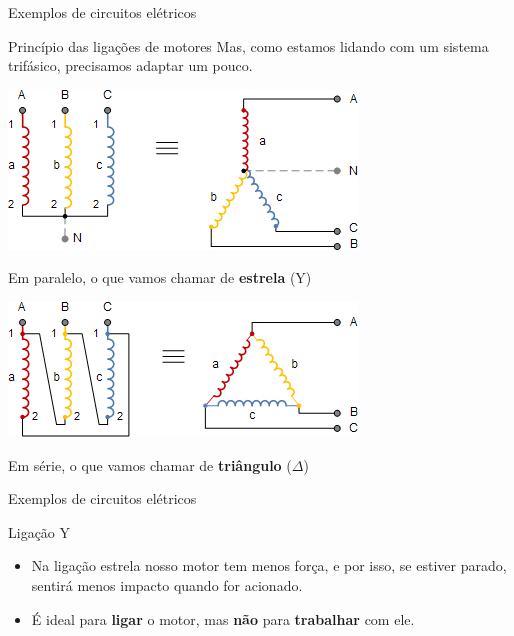 \begin{frame}{Exemplos de circuitos elétricos}
\begin{block}{Princípio das ligações de motores}
	Mas, como estamos lidando com um sistema trifásico, precisamos adaptar um pouco.
\end{block}

\vspace{0.5cm}
\begin{minipage}{0.45\linewidth}
	\centering
	\includegraphics[width=\linewidth]{Figuras/Ch07/fig16.jpg}
	
	Em paralelo, o que vamos chamar de \textbf{estrela} (Y)
\end{minipage}
\hfill
\begin{minipage}{0.45\linewidth}
	\centering
	\includegraphics[width=\linewidth]{Figuras/Ch07/fig17.jpg}
	
	Em série, o que vamos chamar de \textbf{triângulo} ($ \Delta $)
\end{minipage}

\end{frame}

\begin{frame}{Exemplos de circuitos elétricos}
\begin{block}{Ligação Y}
\begin{itemize}
    \item Na ligação estrela nosso motor tem menos força, e por isso, se estiver parado, sentirá menos impacto quando for acionado.
    \item É ideal para \textbf{ligar} o motor, mas \textbf{não} para \textbf{trabalhar} com ele.
\end{itemize}
\end{block}
\end{frame}


